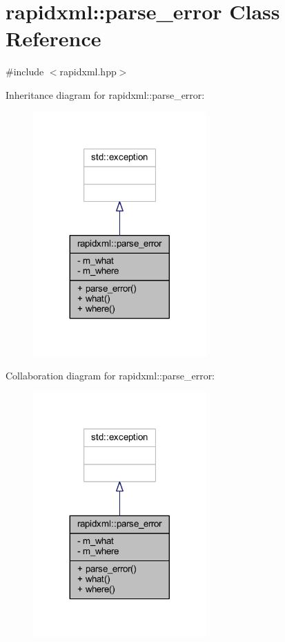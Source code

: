 \hypertarget{classrapidxml_1_1parse__error}{\section{rapidxml\+:\+:parse\+\_\+error Class Reference}
\label{classrapidxml_1_1parse__error}
}


{\ttfamily \#include $<$rapidxml.\+hpp$>$}



Inheritance diagram for rapidxml\+:\+:parse\+\_\+error\+:\nopagebreak
\begin{figure}[H]
\begin{center}
\leavevmode
\includegraphics[width=188pt]{classrapidxml_1_1parse__error__inherit__graph}
\end{center}
\end{figure}


Collaboration diagram for rapidxml\+:\+:parse\+\_\+error\+:\nopagebreak
\begin{figure}[H]
\begin{center}
\leavevmode
\includegraphics[width=188pt]{classrapidxml_1_1parse__error__coll__graph}
\end{center}
\end{figure}
